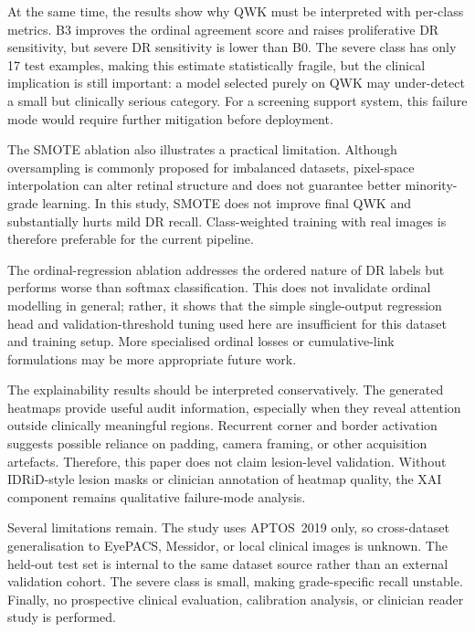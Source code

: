\documentclass[11pt,a4paper]{article}
\begin{document}
At the same time, the results show why QWK must be interpreted with per-class metrics. B3 improves the ordinal agreement score and raises proliferative DR sensitivity, but severe DR sensitivity is lower than B0. The severe class has only 17 test examples, making this estimate statistically fragile, but the clinical implication is still important: a model selected purely on QWK may under-detect a small but clinically serious category. For a screening support system, this failure mode would require further mitigation before deployment.

The SMOTE ablation also illustrates a practical limitation. Although oversampling is commonly proposed for imbalanced datasets, pixel-space interpolation can alter retinal structure and does not guarantee better minority-grade learning. In this study, SMOTE does not improve final QWK and substantially hurts mild DR recall. Class-weighted training with real images is therefore preferable for the current pipeline.

The ordinal-regression ablation addresses the ordered nature of DR labels but performs worse than softmax classification. This does not invalidate ordinal modelling in general; rather, it shows that the simple single-output regression head and validation-threshold tuning used here are insufficient for this dataset and training setup. More specialised ordinal losses or cumulative-link formulations may be more appropriate future work.

The explainability results should be interpreted conservatively. The generated heatmaps provide useful audit information, especially when they reveal attention outside clinically meaningful regions. Recurrent corner and border activation suggests possible reliance on padding, camera framing, or other acquisition artefacts. Therefore, this paper does not claim lesion-level validation. Without IDRiD-style lesion masks or clinician annotation of heatmap quality, the XAI component remains qualitative failure-mode analysis.

Several limitations remain. The study uses APTOS~2019 only, so cross-dataset generalisation to EyePACS, Messidor, or local clinical images is unknown. The held-out test set is internal to the same dataset source rather than an external validation cohort. The severe class is small, making grade-specific recall unstable. Finally, no prospective clinical evaluation, calibration analysis, or clinician reader study is performed.
\end{document}
